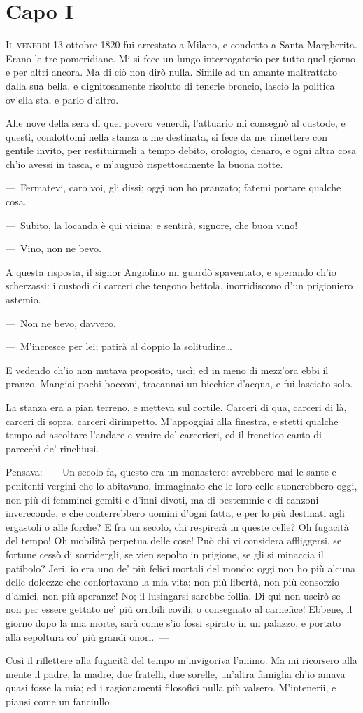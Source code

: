 
\chapter{Capo I}


\lettrine{I}{l venerdì} 13 ottobre 1820 fui arrestato a Milano, e condotto a Santa
Margherita. Erano le tre pomeridiane. Mi si fece un lungo interrogatorio
per tutto quel giorno e per altri ancora. Ma di ciò non dirò nulla. Simile
ad un amante maltrattato dalla sua bella, e dignitosamente risoluto di
tenerle broncio, lascio la politica ov'ella sta, e parlo d'altro.

Alle nove della sera di quel povero venerdì, l'attuario mi consegnò al
custode, e questi, condottomi nella stanza a me destinata, si fece da me
rimettere con gentile invito, per restituirmeli a tempo debito, orologio,
denaro, e ogni altra cosa ch'io avessi in tasca, e m'augurò rispettosamente
la buona notte.

---~Fermatevi, caro voi, gli dissi; oggi non ho pranzato; fatemi portare
qualche cosa.

---~Subito, la locanda è qui vicina; e sentirà, signore, che buon vino!

---~Vino, non ne bevo.

A questa risposta, il signor Angiolino mi guardò spaventato, e sperando
ch'io scherzassi: i custodi di carceri che tengono bettola, inorridiscono
d'un prigioniero astemio.

---~Non ne bevo, davvero.

---~M'incresce per lei; patirà al doppio la solitudine\dots{}

E vedendo ch'io non mutava proposito, uscì; ed in meno di mezz'ora ebbi il
pranzo. Mangiai pochi bocconi, tracannai un bicchier d'acqua, e fui
lasciato solo.

La stanza era a pian terreno, e metteva sul cortile. Carceri di qua,
carceri di là, carceri di sopra, carceri dirimpetto. M'appoggiai alla
finestra, e stetti qualche tempo ad ascoltare l'andare e venire de'
carcerieri, ed il frenetico canto di parecchi de' rinchiusi.

Pensava:~---~Un secolo fa, questo era un monastero: avrebbero mai le sante e
penitenti vergini che lo abitavano, immaginato che le loro celle
suonerebbero oggi, non più di femminei gemiti e d'inni divoti, ma di
bestemmie e di canzoni invereconde, e che conterrebbero uomini d'ogni
fatta, e per lo più destinati agli ergastoli o alle forche? E fra un
secolo, chi respirerà in queste celle? Oh fugacità del tempo! Oh mobilità
perpetua delle cose! Può chi vi considera affliggersi, se fortune cessò di
sorridergli, se vien sepolto in prigione, se gli si minaccia il patibolo?
Jeri, io era uno de' più felici mortali del mondo: oggi non ho più alcuna
delle dolcezze che confortavano la mia vita; non più libertà, non più
consorzio d'amici, non più speranze! No; il lusingarsi sarebbe follia. Di
qui non uscirò se non per essere gettato ne' più orribili covili, o
consegnato al carnefice! Ebbene, il giorno dopo la mia morte, sarà come
s'io fossi spirato in un palazzo, e portato alla sepoltura co' più grandi
onori.~---

Così il riflettere alla fugacità del tempo m'invigoriva l'animo. Ma mi
ricorsero alla mente il padre, la madre, due fratelli, due sorelle,
un'altra famiglia ch'io amava quasi fosse la mia; ed i ragionamenti
filosofici nulla più valsero. M'intenerii, e piansi come un fanciullo.
